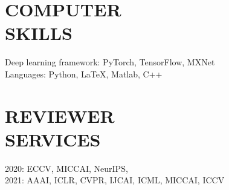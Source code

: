 \documentclass[margin]{res}
\begin{document}
\begin{resume}


\vspace{-1em}
\section{COMPUTER \\ SKILLS} 
                Deep learning framework: PyTorch, TensorFlow, MXNet\\
                Languages: Python, \LaTeX, Matlab, C++

\vspace{-1em}
\section{REVIEWER \\ SERVICES}
                2020: ECCV, MICCAI, NeurIPS,\\ 2021: AAAI, ICLR, CVPR, IJCAI, ICML, MICCAI, ICCV

\end{resume}
\end{document}
